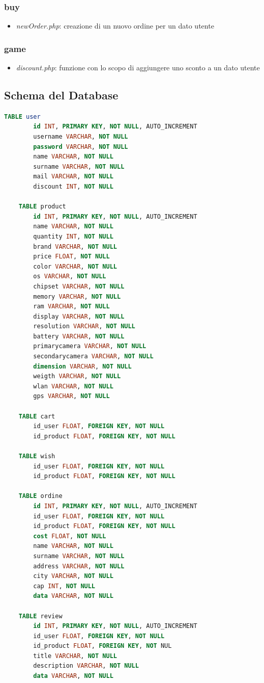 \documentclass[12pt]{extarticle}
\begin{document}
\subsubsection*{buy}
\begin{itemize}
    \item \textit{newOrder.php}: creazione di un nuovo ordine per un dato utente
\end{itemize}

\subsubsection*{game}
\begin{itemize}
    \item  \textit{discount.php}: funzione con lo scopo di aggiungere uno sconto a un dato utente
\end{itemize}

\FloatBarrier
\subsection{Schema del Database}
\begin{lstlisting}[language=SQL]
    TABLE user
        id INT, PRIMARY KEY, NOT NULL, AUTO_INCREMENT
        username VARCHAR, NOT NULL
        password VARCHAR, NOT NULL
        name VARCHAR, NOT NULL
        surname VARCHAR, NOT NULL
        mail VARCHAR, NOT NULL
        discount INT, NOT NULL
    
    TABLE product
        id INT, PRIMARY KEY, NOT NULL, AUTO_INCREMENT
        name VARCHAR, NOT NULL
        quantity INT, NOT NULL
        brand VARCHAR, NOT NULL
        price FLOAT, NOT NULL
        color VARCHAR, NOT NULL
        os VARCHAR, NOT NULL
        chipset VARCHAR, NOT NULL
        memory VARCHAR, NOT NULL
        ram VARCHAR, NOT NULL
        display VARCHAR, NOT NULL
        resolution VARCHAR, NOT NULL
        battery VARCHAR, NOT NULL
        primarycamera VARCHAR, NOT NULL
        secondarycamera VARCHAR, NOT NULL
        dimension VARCHAR, NOT NULL
        weigth VARCHAR, NOT NULL
        wlan VARCHAR, NOT NULL
        gps VARCHAR, NOT NULL
    
    TABLE cart
        id_user FLOAT, FOREIGN KEY, NOT NULL
        id_product FLOAT, FOREIGN KEY, NOT NULL
    
    TABLE wish
        id_user FLOAT, FOREIGN KEY, NOT NULL
        id_product FLOAT, FOREIGN KEY, NOT NULL
    
    TABLE ordine
        id INT, PRIMARY KEY, NOT NULL, AUTO_INCREMENT
        id_user FLOAT, FOREIGN KEY, NOT NULL
        id_product FLOAT, FOREIGN KEY, NOT NULL
        cost FLOAT, NOT NULL
        name VARCHAR, NOT NULL
        surname VARCHAR, NOT NULL
        address VARCHAR, NOT NULL
        city VARCHAR, NOT NULL
        cap INT, NOT NULL
        data VARCHAR, NOT NULL
    
    TABLE review
        id INT, PRIMARY KEY, NOT NULL, AUTO_INCREMENT
        id_user FLOAT, FOREIGN KEY, NOT NULL
        id_product FLOAT, FOREIGN KEY, NOT NUL
        title VARCHAR, NOT NULL
        description VARCHAR, NOT NULL
        data VARCHAR, NOT NULL
\end{lstlisting}
\end{document}
